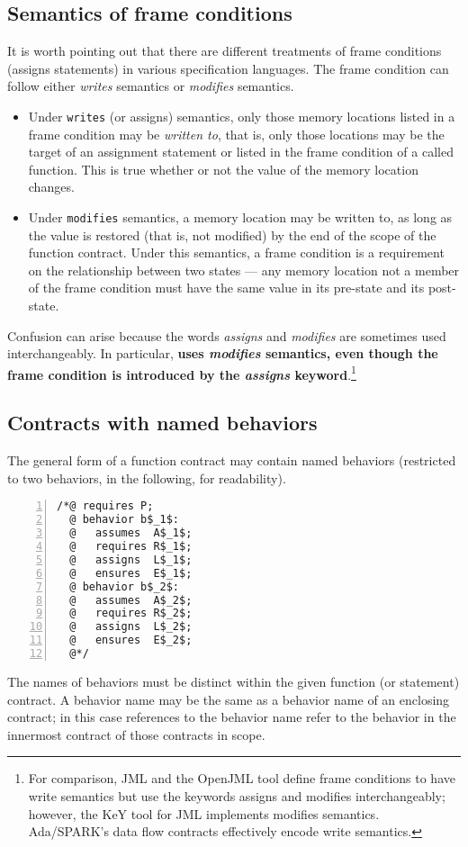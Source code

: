 \subsection{Semantics of frame conditions}
\label{sec:writesSemantics}
It is worth pointing out that there are different treatments of
frame conditions (assigns statements) in various specification languages.
The frame condition can follow either \emph{writes} semantics or \emph{modifies} semantics.
\begin{itemize}
	\item Under \lstinline|writes| (or assigns) semantics, only those memory locations listed in a frame condition may be \emph{written to}, that is, only those locations may be the target of an assignment statement or listed in the frame condition of a called function. This is true whether or not the value of the memory location changes.
	\item Under \lstinline|modifies| semantics, a memory location may be written to, as long as the value is restored (that is, not modified) by the end of the scope of the function contract. Under this semantics, a frame condition is a requirement on the relationship between two states --- any memory location not a member of the frame condition must have the same value in its pre-state and its post-state.
\end{itemize}
Confusion can arise because the words \emph{assigns} and \emph{modifies} are sometimes used interchangeably. In particular, \textbf{\NAME uses
	\emph{modifies} semantics, even though the frame condition is introduced by the \emph{assigns} keyword}.\footnote{For comparison, JML and the OpenJML tool define frame conditions to have write semantics but use the keywords assigns and modifies interchangeably; however, the KeY tool for JML implements modifies semantics. Ada/SPARK's data flow contracts effectively encode write semantics.}

\subsection{Contracts with named behaviors}
\label{subsec:behaviors}
The general form of a function contract may contain named
behaviors (restricted to two behaviors, in the following, for
readability).
\lstset{firstnumber=auto}
\begin{lstlisting}[style=c,basicstyle=\lp@basic,numbers=left,name=behaviors]
/*@ requires P;
  @ behavior b$_1$:
  @   assumes  A$_1$;
  @   requires R$_1$;
  @   assigns  L$_1$;
  @   ensures  E$_1$;
  @ behavior b$_2$:
  @   assumes  A$_2$;
  @   requires R$_2$;
  @   assigns  L$_2$;
  @   ensures  E$_2$;
  @*/
\end{lstlisting}
The names of behaviors must be distinct within the given function (or statement) contract. A behavior name may be the same as a behavior name 
of an enclosing contract; in this case references to the behavior name 
refer to the behavior in the innermost contract of those contracts in scope.


